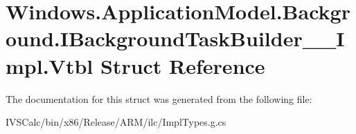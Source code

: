 \hypertarget{struct_windows_1_1_application_model_1_1_background_1_1_i_background_task_builder_____impl_1_1_vtbl}{}\section{Windows.\+Application\+Model.\+Background.\+I\+Background\+Task\+Builder\+\_\+\+\_\+\+Impl.\+Vtbl Struct Reference}
\label{struct_windows_1_1_application_model_1_1_background_1_1_i_background_task_builder_____impl_1_1_vtbl}


The documentation for this struct was generated from the following file\+:\begin{DoxyCompactItemize}
\item 
I\+V\+S\+Calc/bin/x86/\+Release/\+A\+R\+M/ilc/Impl\+Types.\+g.\+cs\end{DoxyCompactItemize}
